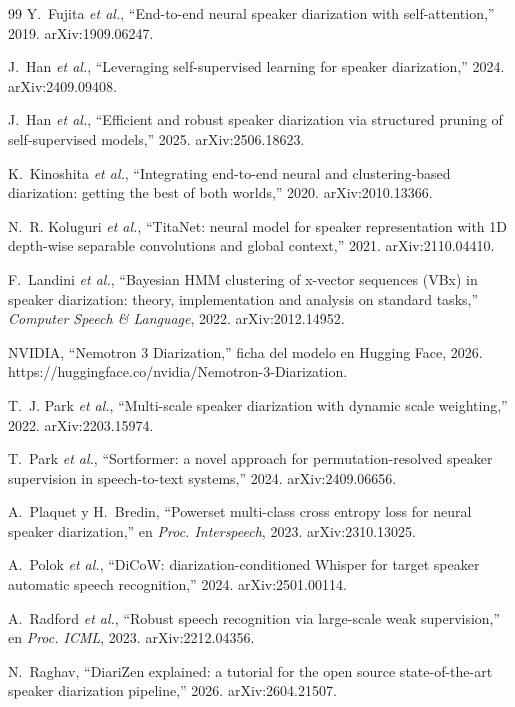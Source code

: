 \documentclass[11pt,a4paper]{article}
\begin{document}
\begin{thebibliography}{99}
 Y.~Fujita \emph{et al.}, ``End-to-end neural speaker diarization with self-attention,'' 2019. arXiv:1909.06247.

 J.~Han \emph{et al.}, ``Leveraging self-supervised learning for speaker diarization,'' 2024. arXiv:2409.09408.

 J.~Han \emph{et al.}, ``Efficient and robust speaker diarization via structured pruning of self-supervised models,'' 2025. arXiv:2506.18623.

 K.~Kinoshita \emph{et al.}, ``Integrating end-to-end neural and clustering-based diarization: getting the best of both worlds,'' 2020. arXiv:2010.13366.

 N.~R. Koluguri \emph{et al.}, ``TitaNet: neural model for speaker representation with 1D depth-wise separable convolutions and global context,'' 2021. arXiv:2110.04410.

 F.~Landini \emph{et al.}, ``Bayesian HMM clustering of x-vector sequences (VBx) in speaker diarization: theory, implementation and analysis on standard tasks,'' \emph{Computer Speech \& Language}, 2022. arXiv:2012.14952.

 NVIDIA, ``Nemotron 3 Diarization,'' ficha del modelo en Hugging Face, 2026. https://huggingface.co/nvidia/Nemotron-3-Diarization.

 T.~J. Park \emph{et al.}, ``Multi-scale speaker diarization with dynamic scale weighting,'' 2022. arXiv:2203.15974.

 T.~Park \emph{et al.}, ``Sortformer: a novel approach for permutation-resolved speaker supervision in speech-to-text systems,'' 2024. arXiv:2409.06656.

 A.~Plaquet y H.~Bredin, ``Powerset multi-class cross entropy loss for neural speaker diarization,'' en \emph{Proc. Interspeech}, 2023. arXiv:2310.13025.

 A.~Polok \emph{et al.}, ``DiCoW: diarization-conditioned Whisper for target speaker automatic speech recognition,'' 2024. arXiv:2501.00114.

 A.~Radford \emph{et al.}, ``Robust speech recognition via large-scale weak supervision,'' en \emph{Proc. ICML}, 2023. arXiv:2212.04356.

 N.~Raghav, ``DiariZen explained: a tutorial for the open source state-of-the-art speaker diarization pipeline,'' 2026. arXiv:2604.21507.


\end{thebibliography}
\end{document}
